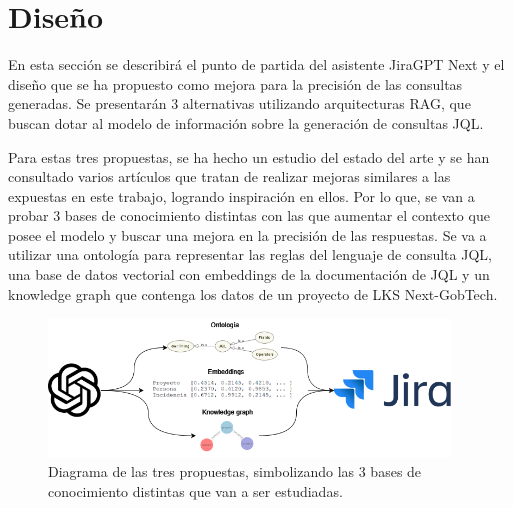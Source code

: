 \section{Diseño}
En esta sección se describirá el punto de partida del asistente JiraGPT Next y el diseño que se ha propuesto como mejora para la precisión de las consultas generadas. Se presentarán 3 alternativas utilizando arquitecturas RAG, que buscan dotar al modelo de información sobre la generación de consultas JQL.

Para estas tres propuestas, se ha hecho un estudio del estado del arte y se han consultado varios artículos que tratan de realizar mejoras similares a las expuestas en este trabajo, logrando inspiración en ellos. Por lo que, se van a probar 3 bases de conocimiento distintas con las que aumentar el contexto que posee el modelo y buscar una mejora en la precisión de las respuestas. Se va a utilizar una ontología para representar las reglas del lenguaje de consulta JQL, una base de datos vectorial con embeddings de la documentación de JQL y un knowledge graph que contenga los datos de un proyecto de LKS Next-GobTech.

\begin{figure}[H]
    \centering
    \includegraphics[width=0.95\textwidth]{images/diagrama_general.png}
    \caption{Diagrama de las tres propuestas, simbolizando las 3 bases de conocimiento distintas que van a ser estudiadas.}\label{fig:diagrama_general}
\end{figure}


